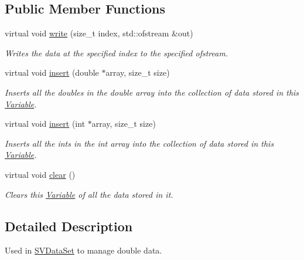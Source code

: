 \subsection*{Public Member Functions}
\begin{DoxyCompactItemize}
\item 
virtual void \hyperlink{classrepast_1_1_double_variable_ae6edc7abb29517ba7b8b77f776a7c223}{write} (size\-\_\-t index, std\-::ofstream \&out)
\begin{DoxyCompactList}\small\item\em Writes the data at the specified index to the specified ofstream. \end{DoxyCompactList}\item 
virtual void \hyperlink{classrepast_1_1_double_variable_a9b7e645d7b1c772b7fd8928a3aca6e65}{insert} (double $\ast$array, size\-\_\-t size)
\begin{DoxyCompactList}\small\item\em Inserts all the doubles in the double array into the collection of data stored in this \hyperlink{classrepast_1_1_variable}{Variable}. \end{DoxyCompactList}\item 
virtual void \hyperlink{classrepast_1_1_double_variable_a234cac0e0fbfd60d724fcae3a8edcc63}{insert} (int $\ast$array, size\-\_\-t size)
\begin{DoxyCompactList}\small\item\em Inserts all the ints in the int array into the collection of data stored in this \hyperlink{classrepast_1_1_variable}{Variable}. \end{DoxyCompactList}\item 
\hypertarget{classrepast_1_1_double_variable_ad9952aa7bc0691d19757b10013e36e0e}{virtual void \hyperlink{classrepast_1_1_double_variable_ad9952aa7bc0691d19757b10013e36e0e}{clear} ()}\label{classrepast_1_1_double_variable_ad9952aa7bc0691d19757b10013e36e0e}

\begin{DoxyCompactList}\small\item\em Clears this \hyperlink{classrepast_1_1_variable}{Variable} of all the data stored in it. \end{DoxyCompactList}\end{DoxyCompactItemize}


\subsection{Detailed Description}
Used in \hyperlink{classrepast_1_1_s_v_data_set}{S\-V\-Data\-Set} to manage double data. 

